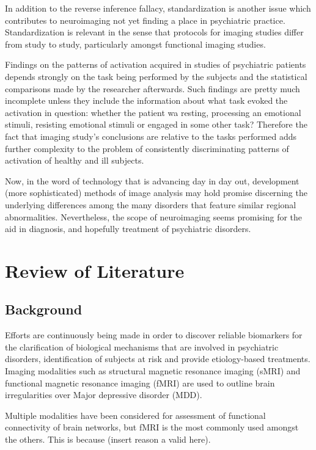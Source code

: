 \documentclass{article}
\begin{document}
In addition to the reverse inference fallacy, standardization is
another issue which contributes to neuroimaging not yet finding a
place in psychiatric practice. Standardization is relevant in the
sense that protocols for imaging studies differ from study to study,
particularly amongst functional imaging studies.

Findings on the patterns of activation acquired in studies of
psychiatric patients depends strongly on the task being performed by
the subjects and the statistical comparisons made by the researcher
afterwards. Such findings are pretty much incomplete unless they
include the information about what task evoked the activation in
question: whether the patient wa resting, processing an emotional
stimuli, resisting emotional stimuli or engaged in some other task?
Therefore the fact that imaging study's conclusions are relative to
the tasks performed adds further complexity to the problem of
consistently discriminating patterns of activation of healthy and ill
subjects.

Now, in the word of technology that is advancing day in day out,
development (more sophisticated) methods of image analysis may hold
promise discerning the underlying differences among the many disorders
that feature similar regional abnormalities. Nevertheless, the scope
of neuroimaging seems promising for the aid in diagnosis, and
hopefully treatment of psychiatric disorders.
\newpage

\section{Review of Literature}

\subsection{Background}

Efforts are continuously being made in order to discover reliable
biomarkers for the clarification of biological mechanisms that are
involved in psychiatric disorders, identification of subjects at risk
and provide etiology-based treatments. Imaging modalities such as
structural magnetic resonance imaging (sMRI) and functional magnetic
resonance imaging (fMRI) are used to outline brain irregularities over
Major depressive disorder (MDD).

Multiple modalities have been considered for assessment of functional
connectivity of brain networks, but fMRI is the most commonly used
amongst the others. This is because (insert reason a valid here).
\end{document}
